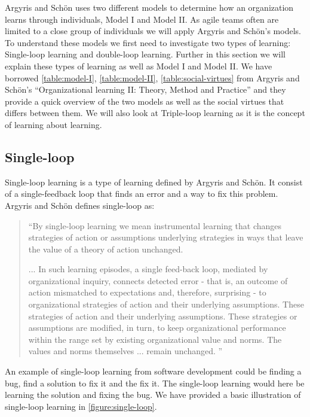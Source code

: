 Argyris and Schön \cite{Argyris1996} uses two different models to determine how an organization learns through individuals, Model I and Model II. As agile teams often are limited to a close group of individuals we will apply Argyris and Schön's models. To understand these models we first need to investigate two types of learning: Single-loop learning and double-loop learning. Further in this section we will explain these types of learning as well as Model I and Model II. We have borrowed \autoref{table:model-I}, \autoref{table:model-II}, \autoref{table:social-virtues} from Argyris and Schön's ``Organizational learning II: Theory, Method and Practice''\cite{Argyris1996} and they provide a quick overview of the two models as well as the social virtues that differs between them. We will also look at Triple-loop learning as it is the concept of learning about learning. 

\subsection{Single-loop}
Single-loop learning is a type of learning defined by Argyris and Schön. It consist of a single-feedback loop that finds an error and a way to fix this problem. Argyris and Schön \cite{Argyris1996} defines single-loop as: 

\begin{quote}
``By single-loop learning we mean instrumental learning that changes strategies of action or assumptions underlying strategies in ways that leave the value of a theory of action unchanged.

... In such learning episodes, a single feed-back loop, mediated by organizational inquiry, connects detected error - that is, an outcome of action mismatched to expectations and, therefore, surprising - to organizational strategies of action and their underlying assumptions. These strategies of action and their underlying assumptions. These strategies or assumptions are modified, in turn, to keep organizational performance within the range set by existing organizational value and norms. The values and norms themselves ... remain unchanged. 
''
\end{quote}

An example of single-loop learning from software development could be finding a bug, find a solution to fix it and the fix it. The single-loop learning would here be learning the solution and fixing the bug. We have provided a basic illustration of single-loop learning in \autoref{figure:single-loop}.

